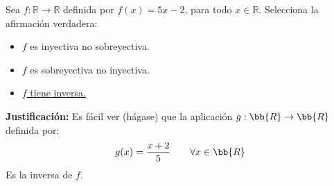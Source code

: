 \documentclass[12pt]{article}
\newcounter{ejercicio}[section] %
\newcounter{ejercicio}
\begin{document}
    \begin{ejercicio}
        Sea $f:\mathbb{R} \rightarrow \mathbb{R}$ definida por $f(x) = 5x -2$, para todo $x \in \mathbb{R}$. Selecciona la afirmación verdadera:
        \begin{itemize}
            \item $f$ es inyectiva no sobreyectiva.
            \item $f$ es sobreyectiva no inyectiva.
            \item \underline{$f$ tiene inversa.}
        \end{itemize}
        \textbf{Justificación:}\newline
        Es fácil ver (hágase) que la aplicación $g:\bb{R}\rightarrow \bb{R}$ definida por:
        $$g(x) = \dfrac{x+2}{5}~~~~~~\forall x \in \bb{R}$$
        Es la inversa de $f$.
    \end{ejercicio}
\end{document}
